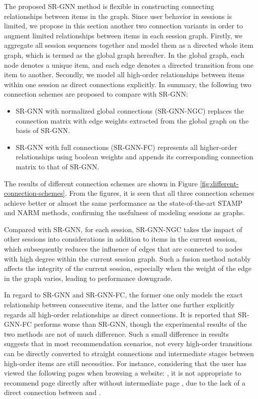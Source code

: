 \documentclass[letterpaper]{article} \usepackage{cite}
\begin{document}
The proposed SR-GNN method is flexible in constructing connecting relationships between items in the graph. Since user behavior in sessions is limited, we propose in this section another two connection variants in order to augment limited relationships between items in each session graph. Firstly, we aggregate all session sequences together and model them as a directed whole item graph, which is termed as the global graph hereafter. In the global graph, each node denotes a unique item, and each edge denotes a directed transition from one item to another. Secondly, we model all high-order relationships between items within one session as direct connections explicitly. In summary, the following two connection schemes are proposed to compare with SR-GNN:
\begin{itemize}
	\item SR-GNN with normalized global connections (SR-GNN-NGC) replaces the connection matrix with edge weights extracted from the global graph on the basis of SR-GNN.
	\item SR-GNN with full connections (SR-GNN-FC) represents all higher-order relationships using boolean weights and appends its corresponding connection matrix to that of SR-GNN.
\end{itemize}

The results of different connection schemes are shown in Figure \ref{fig:different-connection-schemes}. From the figures, it is seen that all three connection schemes achieve better or almost the same performance as the state-of-the-art STAMP and NARM methods, confirming the usefulness of modeling sessions as graphs.

Compared with SR-GNN, for each session, SR-GNN-NGC takes the impact of other sessions into considerations in addition to items in the current session, which subsequently reduces the influence of edges that are connected to nodes with high degree within the current session graph. Such a fusion method notably affects the integrity of the current session, especially when the weight of the edge in the graph varies, leading to performance downgrade.

In regard to SR-GNN and SR-GNN-FC, the former one only models the exact relationship between consecutive items, and the latter one further explicitly regards all high-order relationships as direct connections. It is reported that SR-GNN-FC performs worse than SR-GNN, though the experimental results of the two methods are not of much difference. Such a small difference in results suggests that in most recommendation scenarios, not every high-order transitions can be directly converted to straight connections and intermediate stages between high-order items are still necessities. For instance, considering that the user has viewed the following pages when browsing a website: , it is not appropriate to recommend page  directly after  without intermediate page , due to the lack of a direct connection between  and .
\end{document}
